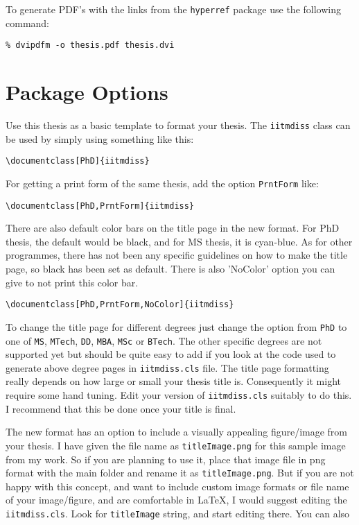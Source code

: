 To generate PDF's with the links from the \verb+hyperref+ package use
the following command:
\begin{verbatim}
% dvipdfm -o thesis.pdf thesis.dvi
\end{verbatim}

\section{Package Options}

Use this thesis as a basic template to format your thesis.  The
\verb+iitmdiss+ class can be used by simply using something like this:
\begin{verbatim}
\documentclass[PhD]{iitmdiss}  
\end{verbatim}

For getting a print form of the same thesis, add the option \verb+PrntForm+ like:
\begin{verbatim}
\documentclass[PhD,PrntForm]{iitmdiss}  
\end{verbatim}

There are also default color bars on the title page in the new format.
For PhD thesis, the default would be black, and for MS thesis, it is cyan-blue. 
As for other programmes, there has not been any specific guidelines on how to 
make the title page, so black has been set as default. There is also 'NoColor'
option you can give to not print this color bar.
\begin{verbatim}
\documentclass[PhD,PrntForm,NoColor]{iitmdiss}  
\end{verbatim}

To change the title page for different degrees just change the option
from \verb+PhD+ to one of \verb+MS+, \verb+MTech+, \verb+DD+, \verb+MBA+, \verb+MSc+ or \verb+BTech+.
The other specific degrees are not supported yet but should be quite easy
to add if you look at the code used to generate above degree pages in \verb+iitmdiss.cls+ file.  The title page formatting really depends on how large or
small your thesis title is.  Consequently it might require some hand
tuning.  Edit your version of \verb+iitmdiss.cls+ suitably to do this.
I recommend that this be done once your title is final.

The new format has an option to include a visually appealing figure/image
from your thesis. I have given the file name as \verb+titleImage.png+ for this
sample image from my work. So if you are planning to use it, place that image file 
in png format with the main folder and rename it as \verb+titleImage.png+. 
But if you are not happy with this concept, and want to include custom image formats or file name 
of your image/figure, and are comfortable in \LaTeX, I would suggest editing the \verb+iitmdiss.cls+.
Look for \verb+titleImage+ string, and start editing there. You can also 

